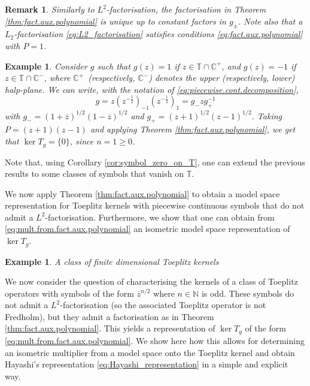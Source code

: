 \documentclass[12pt]{elsarticle}
\numberwithin{equation}{section}
\theoremstyle{plain}
\newtheorem{ex}[thm]{Example}
\newtheorem{rem}[thm]{Remark}
\newcommand{\TT}{\ensuremath{\mathbb{T}}}
\newcommand{\CCp}{\ensuremath{\mathbb{C}^+}}
\newcommand{\CCm}{\ensuremath{\mathbb{C}^-}}
\newcommand{\NNN}{\ensuremath{\mathbb{N}}}
\newcommand{\ol}[1]{\ensuremath{\overline{#1}}}
\newcommand{\zero}{\ensuremath{\{0\}}}
\begin{document}
\begin{rem}
Similarly to $L^2$-factorisation, the factorisation in Theorem \ref{thm:fact.aux.polynomial} is unique up to constant factors in $g_\pm$.
Note also that a $L_2$-factorisation \eqref{eq:L2_factorisation} satisfies conditions \eqref{eq:fact.aux.polynomial} with $P=1$.
\end{rem}


\begin{ex}
\label{ex:g=+-1}
Consider $g$ such that $g(z) = 1$ if $z \in \TT\cap\CCp$, and $g(z)=-1$ if $z \in \TT\cap\CCm$, where \CCp\ (respectively, \CCm) denotes the upper (respectively, lower) halp-plane.
We can write, with the notation of \eqref{eq:piecewise.cont.decomposition},
$$g = z (z^{-\frac{1}{2}})_{-1} (z^{-\frac{1}{2}})_{1}= g_- z g_+^{-1}$$ 
with $g_- = (1 + \ol z)^{1/2} (1 - \ol z)^{1/2}$ and $g_+ = (z+1)^{1/2} (z-1)^{1/2}$.
Taking $P=(z+1)(z-1)$ and applying Theorem \ref{thm:fact.aux.polynomial}, we get that $\ker T_g = \zero$, since $n=1 \geq 0$.
\end{ex}


Note that, using Corollary \ref{cor:symbol_zero_on_T}, one can extend the previous results to some classes of symbols that vanish on \TT.


We now apply Theorem \ref{thm:fact.aux.polynomial} to obtain a model space representation for Toeplitz kernels with piecewise continuous symbols that do not admit a $L^2$-factorisation.
Furthermore, we show that one can obtain from \eqref{eq:mult.from.fact.aux.polynomial} an isometric model space representation of $\ker T_g$.


\begin{ex}
\label{ex:Finite_dimensional_Toeplitz_kernels}
A class of finite dimensional Toeplitz kernels
\end{ex}

\vspace{-8pt}

We now consider the question of characterising the kernels of a class of Toeplitz operators with symbols of the form $\ol z^{n/2}$ where $n\in\NNN$ is odd.
These symbols do not admit a $L^2$-factorisation (so the associated Toeplitz operator is not Fredholm), but they admit a factorisation as in Theorem \ref{thm:fact.aux.polynomial}.
This yields a representation of $\ker T_g$ of the form \eqref{eq:mult.from.fact.aux.polynomial}.
We show here how this allows for determining an isometric multiplier from a model space onto the Toeplitz kernel and obtain Hayashi's representation \eqref{eq:Hayashi_representation} in a simple and explicit way.
\end{document}

